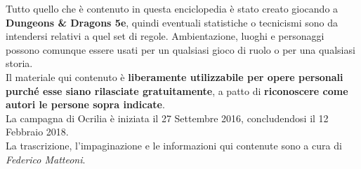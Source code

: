 \documentclass[10pt,twoside,onecolumn,openany]{book}
\begin{document}
Tutto quello che è contenuto in questa enciclopedia è stato creato giocando a \textbf{Dungeons \& Dragons 5e}, quindi eventuali statistiche o tecnicismi sono da intendersi relativi a quel set di regole. Ambientazione, luoghi e personaggi possono comunque essere usati per un qualsiasi gioco di ruolo o per una qualsiasi storia.\\
Il materiale qui contenuto è \textbf{liberamente utilizzabile per opere personali purché esse siano rilasciate gratuitamente}, a patto di \textbf{riconoscere come autori le persone sopra indicate}.\\
La campagna di Ocrilia è iniziata il 27 Settembre 2016, concludendosi il 12 Febbraio 2018.\\
La trascrizione, l'impaginazione e le informazioni qui contenute sono a cura di \textit{Federico Matteoni}.\\
\newpage
\begin{multicols}{2}
\tableofcontents
\end{multicols}
\pagebreak
\end{document}
